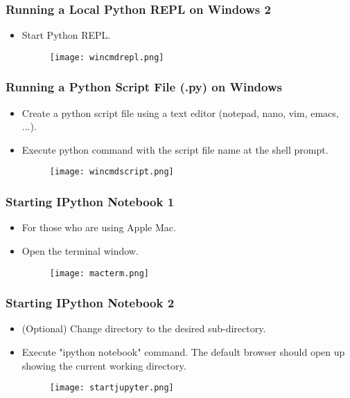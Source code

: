 \documentclass{beamer}
\begin{document}
\begin{frame}[fragile]
\frametitle{Running a Local Python REPL on Windows 2}
\begin{itemize}
\item Start Python REPL.
\begin{figure}[h]
    \texttt{[image: wincmdrepl.png]}
\end{figure}
\end{itemize}
\end{frame}

\begin{frame}[fragile]
\frametitle{Running a Python Script File (.py) on Windows}
\begin{itemize}
\item Create a python script file using a text editor
    (notepad, nano, vim, emacs, ...).
\item Execute python command with the script file name 
    at the shell prompt.
\begin{figure}[h]
\texttt{[image: wincmdscript.png]}
\end{figure}
\end{itemize}
\end{frame}

\begin{frame}[fragile]
\frametitle{Starting IPython Notebook 1}
\begin{itemize}
\item For those who are using Apple Mac.
\item Open the terminal window.
\begin{figure}[h]
  \texttt{[image: macterm.png]}
\end{figure}
\end{itemize}
\end{frame}

\begin{frame}[fragile]
\frametitle{Starting IPython Notebook 2}
\begin{itemize}
\item (Optional) Change directory to the desired sub-directory.
\item Execute "ipython notebook" command. The default browser
    should open up showing the current working directory. 
\begin{figure}[h]
  \texttt{[image: startjupyter.png]}
\end{figure}
\end{itemize}
\end{frame}
\end{document}

